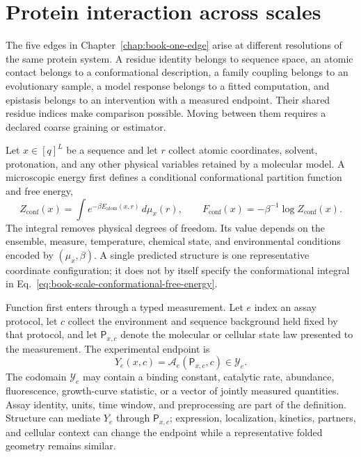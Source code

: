 \section{Protein interaction across scales}
\label{sec:book-protein-scales}

The five edges in Chapter~\ref{chap:book-one-edge} arise at different resolutions of the same
protein system.  A residue identity belongs to sequence space, an atomic contact belongs to a
conformational description, a family coupling belongs to an evolutionary sample, a model response
belongs to a fitted computation, and epistasis belongs to an intervention with a measured
endpoint.  Their shared residue indices make comparison possible.  Moving between them requires a
declared coarse graining or estimator.

Let $x\in[q]^L$ be a sequence and let $r$ collect atomic coordinates, solvent, protonation, and any
other physical variables retained by a molecular model.  A microscopic energy first defines a
conditional conformational partition function and free energy,
\begin{equation}
Z_{\mathrm{conf}}(x)
=\int e^{-\beta E_{\mathrm{atom}}(x,r)}\,d\mu_x(r),
\qquad
F_{\mathrm{conf}}(x)
=-\beta^{-1}\log Z_{\mathrm{conf}}(x).
\label{eq:book-scale-conformational-free-energy}
\end{equation}
The integral removes physical degrees of freedom.  Its value depends on the ensemble, measure,
temperature, chemical state, and environmental conditions encoded by $(\mu_x,\beta)$.  A single
predicted structure is one representative coordinate configuration; it does not by itself specify
the conformational integral in Eq.~\ref{eq:book-scale-conformational-free-energy}.

Function first enters through a typed measurement.  Let $e$ index an assay protocol, let $c$ collect
the environment and sequence background held fixed by that protocol, and let $\mathsf P_{x,c}$ denote
the molecular or cellular state law presented to the measurement.  The experimental endpoint is
\begin{equation}
Y_e(x,c)=\mathcal A_e(\mathsf P_{x,c},c)\in\mathcal Y_e.
\label{eq:book-scale-assay-map}
\end{equation}
The codomain $\mathcal Y_e$ may contain a binding constant, catalytic rate, abundance, fluorescence,
growth-curve statistic, or a vector of jointly measured quantities.  Assay identity, units, time
window, and preprocessing are part of the definition.  Structure can mediate $Y_e$ through
$\mathsf P_{x,c}$; expression, localization, kinetics, partners, and cellular context can change the
endpoint while a representative folded geometry remains similar.

